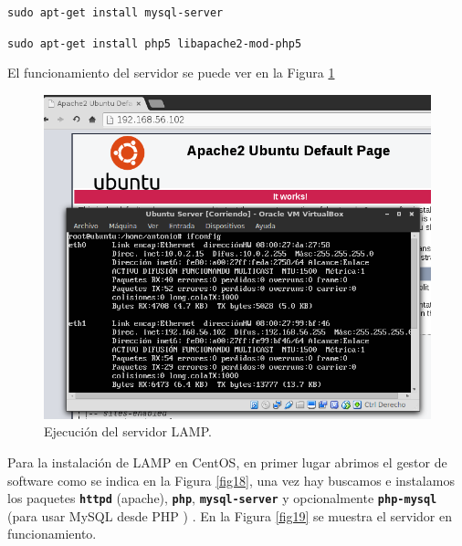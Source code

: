 \hskip3.5cm \texttt{sudo apt-get install mysql-server }

\hskip3.5cm \texttt{sudo apt-get install php5 libapache2-mod-php5}

El funcionamiento del servidor se puede ver en la Figura \ref{fig17}

\begin{figure}[H]
    \begin{center}
        \includegraphics[scale=0.6]{imagenes/img17}
        \caption{Ejecución del servidor LAMP.}
        \label{fig17}
    \end{center}
\end{figure}

Para la instalación de LAMP en CentOS, en primer lugar abrimos el gestor de software como se indica en la Figura \ref{fig18}, una vez hay buscamos e instalamos los paquetes \textbf{\texttt{httpd}} (apache), \textbf{\texttt{php}}, \textbf{\texttt{mysql-server}} y opcionalmente \textbf{\texttt{php-mysql}} (para usar MySQL desde PHP ) \cite{l4}. En la Figura \ref{fig19} se muestra el servidor en funcionamiento.

